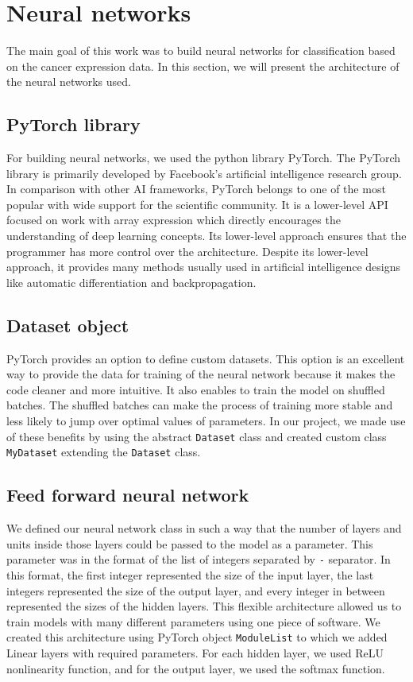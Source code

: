 \newpage
\section{Neural networks}
The main goal of this work was to build neural networks for classification based on the cancer expression data.
In this section, we will present the architecture of the neural networks used.

\subsection{PyTorch library}
For building neural networks, we used the python library PyTorch.
The PyTorch library is primarily developed by Facebook's artificial intelligence research group. \cite{pytorch}
In comparison with other AI frameworks, PyTorch belongs to one of the most popular with wide support for the scientific community.
It is a lower-level API focused on work with array expression which directly encourages the understanding of deep learning concepts.
Its lower-level approach ensures that the programmer has more control over the architecture.
Despite its lower-level approach, it provides many methods usually used in artificial intelligence designs like automatic differentiation and backpropagation.

\subsection{Dataset object}
PyTorch provides an option to define custom datasets.
This option is an excellent way to provide the data for training of the neural network because it makes the code cleaner and more intuitive.
It also enables to train the model on shuffled batches.
The shuffled batches can make the process of training more stable and less likely to jump over optimal values of parameters.
In our project, we made use of these benefits by using the abstract \verb'Dataset' class and created custom class \verb'MyDataset' extending the \verb'Dataset' class.

\subsection{Feed forward neural network}
We defined our neural network class in such a way that the number of layers and units inside those layers could be passed to the model as a parameter.
This parameter was in the format of the list of integers separated by \verb'-' separator.
In this format, the first integer represented the size of the input layer, the last integers represented the size of the output layer, and every integer in between represented the sizes of the hidden layers.
This flexible architecture allowed us to train models with many different parameters using one piece of software.
We created this architecture using PyTorch object \verb'ModuleList' to which we added Linear layers with required parameters.
For each hidden layer, we used ReLU nonlinearity function, and for the output layer, we used the softmax function.

